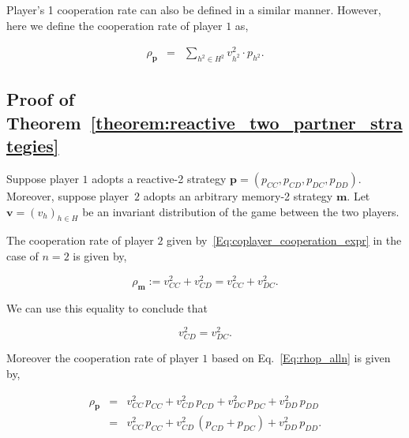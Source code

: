 \documentclass[11pt]{article}
\theoremstyle{plainCl1}
\theoremstyle{plainCl2}
\begin{document}
Player's 1 cooperation rate can also be defined in a similar manner. However,
here we define the cooperation rate of player $1$ as,

\begin{equation} \label{Eq:rhop_alln}
  \begin{array}{lll}
    \rho_\mathbf{p} &= &\displaystyle \sum_{h^2 \in H^2} v^2_{h^2} \cdot p_{h^2}.
  \end{array}
\end{equation}


\subsection{Proof of Theorem~\ref{theorem:reactive_two_partner_strategies}}\label{appendix:reactive_two_akin_generalized}

Suppose player $1$ adopts a reactive-2 strategy
$\mathbf{p}\!=\!(p_{CC},p_{CD}, p_{DC}, p_{DD})$. Moreover, suppose player~$2$
adopts an arbitrary memory-2 strategy $\mathbf{m}$. Let $\mathbf{v}=(v_h)_{h\in
H}$ be an invariant distribution of the game between the two players.

The cooperation rate of player $2$ given by~\ref{Eq:coplayer_cooperation_expr}
in the case of $n=2$ is given by,

\begin{equation} \label{Eq:rhoq_n2}
\rho_\mathbf{m} := v^2_{CC} + v^2_{CD} = v^2_{CC} + v^2_{DC}.
\end{equation}

We can use this equality to conclude that

\begin{equation} \label{Eq:EqualityV}
v^2_{CD} = v^2_{DC}.
\end{equation}

Moreover the cooperation rate of player $1$ based on Eq.~\ref{Eq:rhop_alln} is given by,

\begin{equation} \label{Eq:rhop_n2}
\begin{array}{lll}
\rho_\mathbf{p} &= &\displaystyle v^2_{CC}\, p_{CC} +  v^2_{CD}\,p_{CD} + v^2_{DC}\, p_{DC} + v^2_{DD}\, p_{DD}\\[0.2cm]
	& =  &v^2_{CC}\, p_{CC} +  v^2_{CD}\,(p_{CD}\!+\!p_{DC}) + v^2_{DD}\, p_{DD}.
\end{array}
\end{equation}
\end{document}
